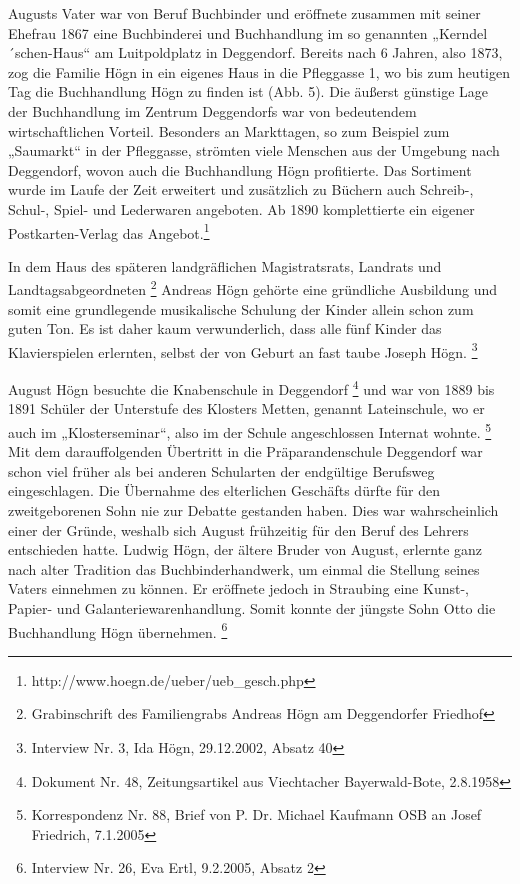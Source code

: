 \documentclass[a4paper]{article}
\newcounter{Abb}
\begin{document}
Augusts Vater war von Beruf Buchbinder und eröffnete zusammen mit seiner
Ehefrau 1867 eine Buchbinderei und Buchhandlung im so genannten
„Kerndel´schen-Haus“ am Luitpoldplatz in Deggendorf. Bereits nach 6
Jahren, also 1873, zog die Familie Högn in ein eigenes Haus in die
Pfleggasse 1, wo bis zum heutigen Tag die Buchhandlung Högn zu finden
ist (Abb. 5). Die äußerst günstige Lage der Buchhandlung im Zentrum
Deggendorfs war von bedeutendem wirtschaftlichen Vorteil. Besonders an
Markttagen, so zum Beispiel zum „Saumarkt“ in der Pfleggasse, strömten
viele Menschen aus der Umgebung nach Deggendorf, wovon auch die
Buchhandlung Högn profitierte. Das Sortiment wurde im Laufe der Zeit
erweitert und zusätzlich zu Büchern auch Schreib-, Schul-, Spiel- und
Lederwaren angeboten. Ab 1890 komplettierte ein eigener
Postkarten-Verlag das Angebot.\footnote{
http://www.hoegn.de/ueber/ueb\_gesch.php}

In dem Haus des späteren landgräflichen Magistratsrats, Landrats und
Landtagsabgeordneten \footnote{Grabinschrift des Familiengrabs Andreas
Högn am Deggendorfer Friedhof} Andreas Högn gehörte eine gründliche
Ausbildung und somit eine grundlegende musikalische Schulung der Kinder
allein schon zum guten Ton. Es ist daher kaum verwunderlich, dass alle
fünf Kinder das Klavierspielen erlernten, selbst der von Geburt an fast
taube Joseph Högn. \footnote{Interview Nr. 3, Ida Högn, 29.12.2002,
Absatz 40}

August Högn besuchte die Knabenschule in Deggendorf \footnote{Dokument
Nr. 48, Zeitungsartikel aus Viechtacher Bayerwald-Bote, 2.8.1958} und
war von 1889 bis 1891 Schüler der Unterstufe des Klosters Metten,
genannt Lateinschule, wo er auch im „Klosterseminar“, also im der
Schule angeschlossen Internat wohnte. \footnote{Korrespondenz Nr. 88,
Brief von P. Dr. Michael Kaufmann OSB an Josef Friedrich, 7.1.2005} Mit
dem darauffolgenden Übertritt in die Präparandenschule Deggendorf war
schon viel früher als bei anderen Schularten der endgültige Berufsweg
eingeschlagen. Die Übernahme des elterlichen Geschäfts dürfte für den
zweitgeborenen Sohn nie zur Debatte gestanden haben. Dies war
wahrscheinlich einer der Gründe, weshalb sich August frühzeitig für den
Beruf des Lehrers entschieden hatte. Ludwig Högn, der ältere Bruder von
August, erlernte ganz nach alter Tradition das Buchbinderhandwerk, um
einmal die Stellung seines Vaters einnehmen zu können. Er eröffnete
jedoch in Straubing eine Kunst-, Papier- und Galanteriewarenhandlung.
Somit konnte der jüngste Sohn Otto die Buchhandlung Högn
übernehmen. \footnote{Interview Nr. 26, Eva Ertl, 9.2.2005, Absatz 2}
\end{document}
